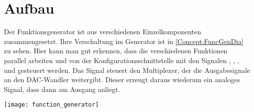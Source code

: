 \section{Aufbau}
Der Funktionsgenerator ist aus verschiedenen Einzelkomponenten zusammengesetzt.
Ihre Verschaltung im Generator ist in \cref{Concept:FuncGenDia} zu sehen.
Hier kann man gut erkennen, dass die verschiedenen Funktionen parallel arbeiten und von der Konfigurationsschnittstelle mit den Signalen , , ,  und  gesteuert werden.
Das Signal  steuert den Multiplexer, der die Ausgabesignale  an den DAC-Wandler weitergibt.
Dieser erzeugt daraus wiederum ein analoges Signal, dass dann am Ausgang anliegt.

\begin{sidewaysfigure}[h]
  \texttt{[image: function\_generator]}
  \caption{Diagramm des Funktionsgenerators, zusammengesetzt aus seinen Einzelkomponenten. Aus Gründen der Übersichtlichkeit sind die  Signale und  Signale nicht angeschlossen dargestellt. Alle  Signale sind an den Systemtakt angeschlossen und alle  Signale liegen auf Masse.}  \label{Concept:FuncGenDia}
\end{sidewaysfigure}

